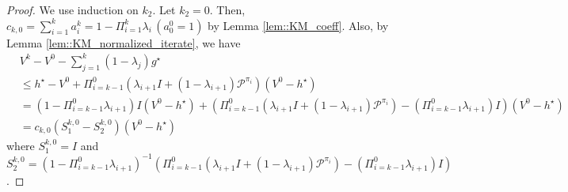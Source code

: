 \documentclass{article} %
\newcommand{\cP}{\mathcal{P}}
\newcommand*{\para}[1]{\left({#1}\right)}
\begin{document}
\begin{proof}
We use induction on $k_2$. Let $ k_2=0$. Then, $c_{k,0}=\sum^{k}_{i=1}  a^{k}_i=1-\Pi^{k}_{i=1}\lambda_{i} \,(a^0_0=1)$ by Lemma \ref{lem::KM_coeff}. Also, by Lemma \ref{lem::KM_normalized_iterate}, we have 
\begin{align*}
    &V^k-V^0- \sum^{k}_{j=1} (1-\lambda_{j})g^{\star} \\&\le h^{\star}-V^0+\Pi^{0}_{i=k-1}(\lambda_{i+1}I+(1-\lambda_{i+1}) \cP^{\pi_i}) (V^0-h^{\star})
    \\& = (1-\Pi^{0}_{i=k-1}\lambda_{i+1})I(V^0-h^{\star})+(\Pi^{0}_{i=k-1}(\lambda_{i+1}I+(1-\lambda_{i+1}) \cP^{\pi_i})-(\Pi^{0}_{i=k-1}\lambda_{i+1})I) (V^0-h^{\star})
    \\& = c_{k, 0}(S^{k,0}_{1}-S^{k,0}_{2})(V^0-h^{\star})
    \end{align*}
where $S^{k,0}_{1} = I$ and $ S^{k,0}_{2} = (1-\Pi^{0}_{i=k-1}\lambda_{i+1})^{-1}\para{\Pi^{0}_{i=k-1}(\lambda_{i+1}I+(1-\lambda_{i+1}) \cP^{\pi_i})-(\Pi^{0}_{i=k-1}\lambda_{i+1})I}$.


\end{proof}
\end{document}
